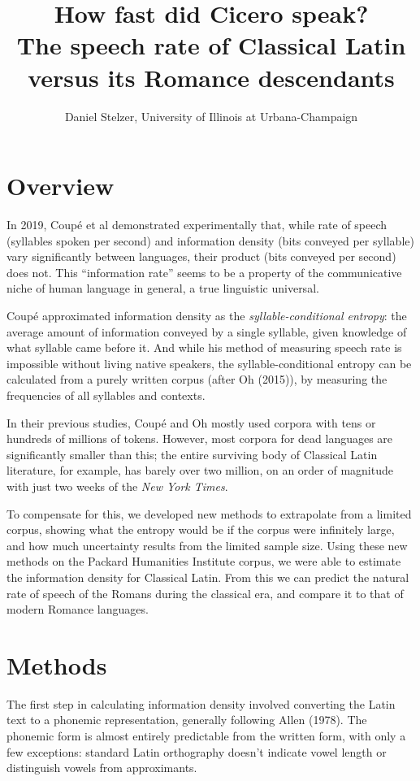 \documentclass[12pt]{article}
\title{\vspace{-5ex} \Large \textbf{How fast did Cicero speak?} \\ \large The speech rate of Classical Latin versus its Romance descendants \vspace{-3.5ex}}
\author{\normalsize Daniel Stelzer, University of Illinois at Urbana-Champaign}
\date{\vspace{-5ex}}
\begin{document}
\maketitle

\section{Overview}


In 2019, Coupé et al demonstrated experimentally that, while rate of speech (syllables spoken per second) and information density (bits conveyed per syllable) vary significantly between languages, their product (bits conveyed per second) does not. This ``information rate'' seems to be a property of the communicative niche of human language in general, a true linguistic universal.

Coupé approximated information density as the \emph{syllable-conditional entropy}: the average amount of information conveyed by a single syllable, given knowledge of what syllable came before it. And while his method of measuring speech rate is impossible without living native speakers, the syllable-conditional entropy can be calculated from a purely written corpus (after Oh (2015)), by measuring the frequencies of all syllables and contexts.

In their previous studies, Coupé and Oh mostly used corpora with tens or hundreds of millions of tokens. However, most corpora for dead languages are significantly smaller than this; the entire surviving body of Classical Latin literature, for example, has barely over two million, on an order of magnitude with just two weeks of the \emph{New York Times}.

To compensate for this, we developed new methods to extrapolate from a limited corpus, showing what the entropy would be if the corpus were infinitely large, and how much uncertainty results from the limited sample size. Using these new methods on the Packard Humanities Institute corpus, we were able to estimate the information density for Classical Latin. From this we can predict the natural rate of speech of the Romans during the classical era, and compare it to that of modern Romance languages.

\section{Methods}

The first step in calculating information density involved converting the Latin text to a phonemic representation, generally following Allen (1978). The phonemic form is almost entirely predictable from the written form, with only a few exceptions: standard Latin orthography doesn't indicate vowel length or distinguish vowels from approximants.
\end{document}
